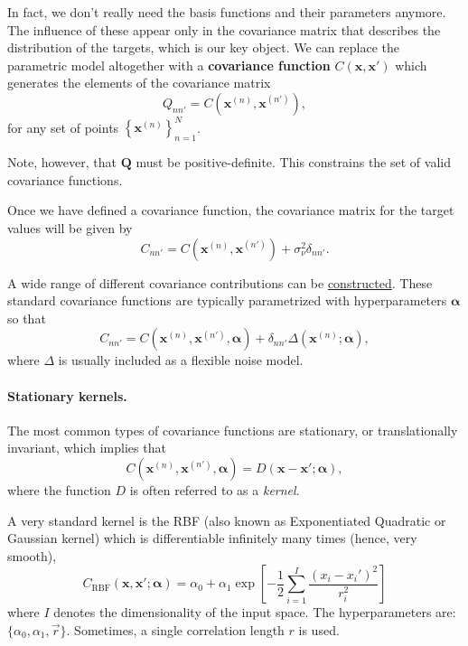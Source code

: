 \documentclass[%
oneside,                 %
final,                   %
10pt]{article}
\begin{document}
In fact, we don't really need the basis functions and their parameters anymore. The influence of these appear only in the covariance matrix that describes the distribution of the targets, which is our key object. We can replace the parametric model altogether with a \textbf{covariance function} $C( \boldsymbol{x}, \boldsymbol{x}' )$ which generates the  elements of the covariance matrix
\[
Q_{nn'} = C \left( \boldsymbol{x}^{(n)}, \boldsymbol{x}^{(n')} \right),
\]
for any set of points $\left\{ \boldsymbol{x}^{(n)} \right\}_{n=1}^N$.

Note, however, that $\boldsymbol{Q}$ must be positive-definite. This constrains the set of valid covariance functions.

Once we have defined a covariance function, the covariance matrix for the target values will be given by
\[
C_{nn'} = C \left( \boldsymbol{x}^{(n)}, \boldsymbol{x}^{(n')} \right) + \sigma_\nu^2 \delta_{nn'}.
\]

A wide range of different covariance contributions can be \href{{https://en.wikipedia.org/wiki/Gaussian_process#Covariance_functions}}{constructed}. These standard covariance functions are typically parametrized with hyperparameters $\boldsymbol{\alpha}$ so that 
\[
C_{nn'} = C \left( \boldsymbol{x}^{(n)}, \boldsymbol{x}^{(n')}, \boldsymbol{\alpha} \right) + \delta_{nn'} \Delta \left( \boldsymbol{x}^{(n)};  \boldsymbol{\alpha} \right),
\]
where $\Delta$ is usually included as a flexible noise model.

\paragraph{Stationary kernels.}
The most common types of covariance functions are stationary, or translationally invariant, which implies that 
\[
C \left( \boldsymbol{x}^{(n)}, \boldsymbol{x}^{(n')}, \boldsymbol{\alpha} \right) = D \left( \boldsymbol{x} - \boldsymbol{x}'; \boldsymbol{\alpha} \right),
\]
where the function $D$ is often referred to as a \emph{kernel}.

A very standard kernel is the RBF (also known as Exponentiated Quadratic or Gaussian kernel) which is differentiable infinitely many times (hence, very smooth),
\[ 
C_\mathrm{RBF}(\mathbf{x},\mathbf{x}'; \boldsymbol{\alpha}) = \alpha_0 + \alpha_1 \exp \left[ -\frac{1}{2} \sum_{i=1}^I \frac{(x_{i} - x_{i}')^2}{r_i^2} \right] 
\]
where $I$ denotes the dimensionality of the input space. The hyperparameters are: $\{ \alpha_0, \alpha_1, \vec{r} \}$. Sometimes, a single correlation length $r$ is used.
\end{document}
